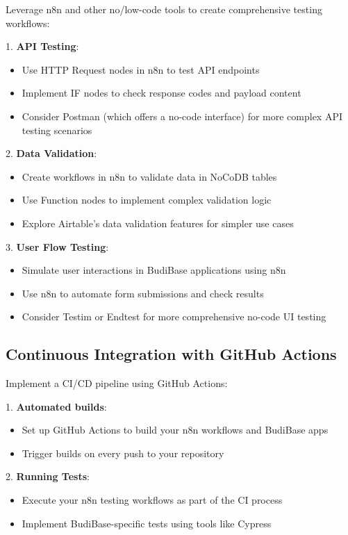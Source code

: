 Leverage n8n and other no/low-code tools to create comprehensive testing workflows:

1. \textbf{API Testing}:
   \begin{itemize}
     \item Use HTTP Request nodes in n8n to test API endpoints
     \item Implement IF nodes to check response codes and payload content
     \item Consider Postman (which offers a no-code interface) for more complex API testing scenarios
   \end{itemize}


2. \textbf{Data Validation}:
   \begin{itemize}
     \item Create workflows in n8n to validate data in NoCoDB tables
     \item Use Function nodes to implement complex validation logic
     \item Explore Airtable's data validation features for simpler use cases
   \end{itemize}

3. \textbf{User Flow Testing}:
   \begin{itemize}
     \item Simulate user interactions in BudiBase applications using n8n
     \item Use n8n to automate form submissions and check results
     \item Consider Testim or Endtest for more comprehensive no-code UI testing
   \end{itemize}

\subsection{Continuous Integration with GitHub Actions}

Implement a CI/CD pipeline using GitHub Actions:

1. \textbf{Automated builds}:
\begin{itemize}
    \item Set up GitHub Actions to build your n8n workflows and BudiBase apps
    \item Trigger builds on every push to your repository
\end{itemize}

2. \textbf{Running Tests}:
\begin{itemize}
    \item Execute your n8n testing workflows as part of the CI process
    \item Implement BudiBase-specific tests using tools like Cypress
\end{itemize}

